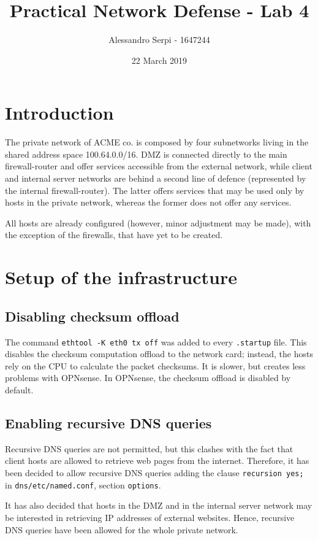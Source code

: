 \documentclass[draft]{homework}
\title{Practical Network Defense - Lab 4}
\author{Alessandro Serpi - 1647244}
\date{22 March 2019}
\newcommand{\opn}{OPNsense\xspace}
\begin{document}
    \maketitle
    \tableofcontents
    
    
    \section{Introduction}
    The private network of ACME co. is composed by four subnetworks living in the shared address space 100.64.0.0/16. DMZ is connected directly to the main firewall-router and offer services accessible from the external network, while client and internal server networks are behind a second line of defence (represented by the internal firewall-router). The latter offers services that may be used only by hosts in the private network, whereas the former does not offer any services.
    
    All hosts are already configured (however, minor adjustment may be made), with the exception of the firewalls, that have yet to be created. 
    
    
    \section{Setup of the infrastructure}
    \subsection{Disabling checksum offload}
    The command \texttt{ethtool -K eth0 tx off} was added to every \texttt{.startup} file. This disables the checksum computation offload to the network card; instead, the hosts rely on the CPU to calculate the packet checksums. It is slower, but creates less problems with \opn.
    In \opn, the checksum offload is disabled by default.
    
    \subsection{Enabling recursive DNS queries}
    Recursive DNS queries are not permitted, but this clashes with the fact that client hosts are allowed to retrieve web pages from the internet. Therefore, it has been decided to allow recursive DNS queries adding the clause \texttt{recursion yes;} in \texttt{dns/etc/named.conf}, section \texttt{options}.
    
    It has also decided that hosts in the DMZ and in the internal server network may be interested in retrieving IP addresses of external websites. Hence, recursive DNS queries have been allowed for the whole private network.
    
\end{document}
